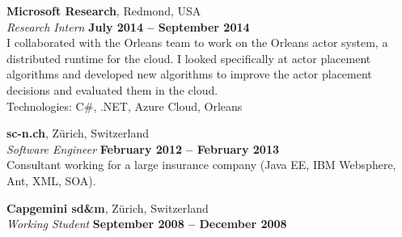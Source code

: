 \documentclass[margin,line]{resume}
\begin{document}
\begin{resume}

    \textbf{Microsoft Research}, Redmond, USA \vspace{2mm}\\\vspace{1mm}%
    \textsl{Research Intern} \hfill \textbf{July 2014 -- September 2014}\\
    I collaborated with the Orleans team to work on the Orleans
    actor system, a distributed runtime for the cloud. I looked specifically at
    actor placement algorithms and developed new algorithms to improve the actor placement
    decisions and evaluated them in the cloud.\\ Technologies: C\#, .NET, Azure Cloud, Orleans


    \textbf{sc-n.ch}, Zürich, Switzerland \vspace{2mm}\\\vspace{1mm}%
    \textsl{Software Engineer} \hfill \textbf{February 2012 -- February 2013}\\
    Consultant working for a large insurance company (Java EE, IBM Websphere, Ant, XML, SOA).


    \textbf{Capgemini sd\&m}, Zürich, Switzerland \vspace{2mm}\\\vspace{1mm}%
    \textsl{Working Student} \hfill \textbf{September 2008 -- December 2008}\\


\end{resume}
\end{document}
